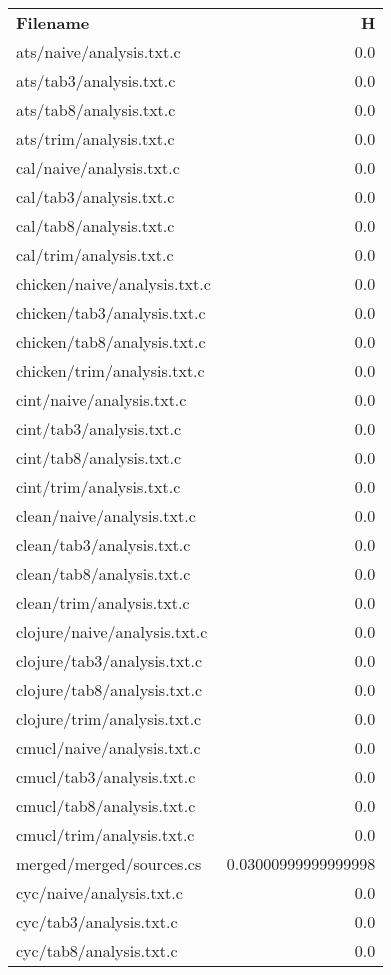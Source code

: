 \begin{longtable}{l r}
\textbf{Filename} &  \textbf{H} \\
{ats/naive/analysis.txt.c} & 0.0  \\
{ats/tab3/analysis.txt.c} & 0.0  \\
{ats/tab8/analysis.txt.c} & 0.0  \\
{ats/trim/analysis.txt.c} & 0.0  \\
{cal/naive/analysis.txt.c} & 0.0  \\
{cal/tab3/analysis.txt.c} & 0.0  \\
{cal/tab8/analysis.txt.c} & 0.0  \\
{cal/trim/analysis.txt.c} & 0.0  \\
{chicken/naive/analysis.txt.c} & 0.0  \\
{chicken/tab3/analysis.txt.c} & 0.0  \\
{chicken/tab8/analysis.txt.c} & 0.0  \\
{chicken/trim/analysis.txt.c} & 0.0  \\
{cint/naive/analysis.txt.c} & 0.0  \\
{cint/tab3/analysis.txt.c} & 0.0  \\
{cint/tab8/analysis.txt.c} & 0.0  \\
{cint/trim/analysis.txt.c} & 0.0  \\
{clean/naive/analysis.txt.c} & 0.0  \\
{clean/tab3/analysis.txt.c} & 0.0  \\
{clean/tab8/analysis.txt.c} & 0.0  \\
{clean/trim/analysis.txt.c} & 0.0  \\
{clojure/naive/analysis.txt.c} & 0.0  \\
{clojure/tab3/analysis.txt.c} & 0.0  \\
{clojure/tab8/analysis.txt.c} & 0.0  \\
{clojure/trim/analysis.txt.c} & 0.0  \\
{cmucl/naive/analysis.txt.c} & 0.0  \\
{cmucl/tab3/analysis.txt.c} & 0.0  \\
{cmucl/tab8/analysis.txt.c} & 0.0  \\
{cmucl/trim/analysis.txt.c} & 0.0  \\
{merged/merged/sources.cs} & 0.03000999999999998  \\
{cyc/naive/analysis.txt.c} & 0.0  \\
{cyc/tab3/analysis.txt.c} & 0.0  \\
{cyc/tab8/analysis.txt.c} & 0.0  \\

\end{longtable}
